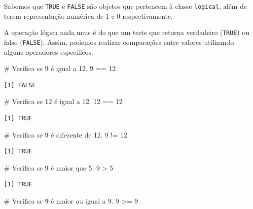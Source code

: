 \documentclass[
  letterpaper,
  DIV=11,
  numbers=noendperiod]{scrreprt}
\newenvironment{Shaded}{\begin{snugshade}}{\end{snugshade}}
\newcommand{\CommentTok}[1]{\textcolor[rgb]{0.37,0.37,0.37}{#1}}
\newcommand{\DecValTok}[1]{\textcolor[rgb]{0.68,0.00,0.00}{#1}}
\newcommand{\SpecialCharTok}[1]{\textcolor[rgb]{0.37,0.37,0.37}{#1}}
\begin{document}
Sabemos que \texttt{TRUE} e \texttt{FALSE} são objetos que pertencem à
classe \texttt{logical}, além de terem representação numérica de 1 e 0
respectivamente.

A operação lógica nada mais é do que um teste que retorna verdadeiro
(\texttt{TRUE}) ou falso (\texttt{FALSE}). Assim, podemos realizar
comparações entre valores utilizando alguns operadores específicos.

\begin{Shaded}
\begin{Highlighting}[]
\CommentTok{\# Verifica se 9 é igual a 12.}
\DecValTok{9} \SpecialCharTok{==} \DecValTok{12}
\end{Highlighting}
\end{Shaded}

\begin{verbatim}
[1] FALSE
\end{verbatim}

\begin{Shaded}
\begin{Highlighting}[]
\CommentTok{\# Verifica se 12 é igual a 12.}
\DecValTok{12} \SpecialCharTok{==} \DecValTok{12}
\end{Highlighting}
\end{Shaded}

\begin{verbatim}
[1] TRUE
\end{verbatim}

\begin{Shaded}
\begin{Highlighting}[]
\CommentTok{\# Verifica se 9 é diferente de 12.}
\DecValTok{9} \SpecialCharTok{!=} \DecValTok{12}
\end{Highlighting}
\end{Shaded}

\begin{verbatim}
[1] TRUE
\end{verbatim}

\begin{Shaded}
\begin{Highlighting}[]
\CommentTok{\# Verifica se 9 é maior que 5.}
\DecValTok{9} \SpecialCharTok{\textgreater{}} \DecValTok{5}
\end{Highlighting}
\end{Shaded}

\begin{verbatim}
[1] TRUE
\end{verbatim}

\begin{Shaded}
\begin{Highlighting}[]
\CommentTok{\# Verifica se 9 é maior ou igual a 9.}
\DecValTok{9} \SpecialCharTok{\textgreater{}=} \DecValTok{9}
\end{Highlighting}
\end{Shaded}
\end{document}
